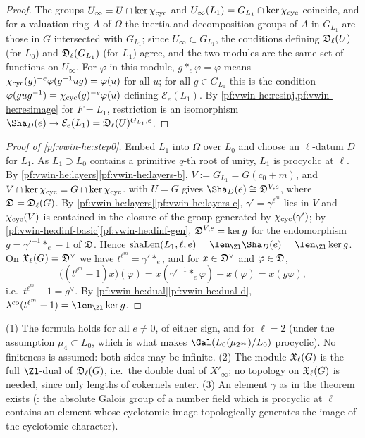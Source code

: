 \begin{proof}
The groups $U_\infty=U\cap\ker\chi_{\mathrm{cyc}}$ and $U_\infty(L_1)=G_{L_1}\cap\ker\chi_{\mathrm{cyc}}$ coincide, and for a valuation ring
$A$ of $\Omega$ the inertia and decomposition groups of $A$ in $G_{L_1}$ are those in $G$ intersected with $G_{L_1}$;
since $U_\infty\subset G_{L_1}$, the conditions defining $\mathfrak D_\ell(U)$ (for $L_0$) and $\mathfrak D_\ell(G_{L_1})$
(for $L_1$) agree, and the two modules are the same set of functions on $U_\infty$. For $\varphi$ in this module,
$g\ast_e\varphi=\varphi$ means $\chi_{\mathrm{cyc}}(g)^{-e}\varphi(g^{-1}ug)=\varphi(u)$ for all $u$; for all $g\in G_{L_1}$ this
is the condition $\varphi(gug^{-1})=\chi_{\mathrm{cyc}}(g)^{-e}\varphi(u)$ defining $\mathcal E_e(L_1)$. By
\cref{pf:vwin-he:resinj,pf:vwin-he:resimage} for $F=L_1$, restriction is an isomorphism
$\Sha_D(e)\to\mathcal E_e(L_1)=\vwinheD_\ell(U)^{G_{L_1},e}$.
\end{proof}

\begin{proof}[Proof of \cref{pf:vwin-he:step0}]
Embed $L_1$ into $\Omega$ over $L_0$ and choose an $\ell$-datum $D$ for $L_1$. As $L_1\supset L_0$ contains a primitive
$q$-th root of unity, $L_1$ is procyclic at $\ell$. By \cref{pf:vwin-he:layers}\ref{pf:vwin-he:layers-b},
$V:=G_{L_1}=G(c_0+m)$, and $V\cap\ker\chi_{\mathrm{cyc}}=G\cap\ker\chi_{\mathrm{cyc}}$.  with $U=G$ gives
$\Sha_D(e)\cong\vwinheD^{V,e}$, where $\mathfrak D=\mathfrak D_\ell(G)$. By
\cref{pf:vwin-he:layers}\ref{pf:vwin-he:layers-c}, $\gamma'=\gamma^{\ell^m}$ lies in $V$ and $\chi_{\mathrm{cyc}}(V)$ is contained in the
closure of the group generated by $\chi_{\mathrm{cyc}}(\gamma')$; by
\cref{pf:vwin-he:dinf-basic}\ref{pf:vwin-he:dinf-gen}, $\mathfrak D^{V,e}=\ker g$ for the endomorphism
$g=\gamma'^{-1}\ast_e-1$ of $\mathfrak D$. Hence $\mathrm{shaLen}(L_1,\ell,e)=\len_{\Zl}\Sha_D(e)=\len_{\Zl}\ker g$. On
$\mathfrak X_\ell(G)=\mathfrak D^\vee$ we have $t^{\ell^m}=\gamma'\ast_e$, and for $x\in\mathfrak D^\vee$ and
$\varphi\in\mathfrak D$,
\[
 \bigl((t^{\ell^m}-1)x\bigr)(\varphi)=x(\gamma'^{-1}\ast_e\varphi)-x(\varphi)=x(g\varphi),
\]
i.e.\ $t^{\ell^m}-1=g^\vee$. By \cref{pf:vwin-he:dual}\ref{pf:vwin-he:dual-d},
$\vwinhecoker(t^{\ell^m}-1)=\len_{\Zl}\ker g$.
\end{proof}

\begin{remark}\label{pf:vwin-he:rem-descent}
(1) The formula holds for all $e\ne0$, of either sign, and for $\ell=2$ (under the assumption $\mu_4\subset L_0$, which
is what makes $\Gal(L_0(\mu_{2^\infty})/L_0)$ procyclic). No finiteness is assumed: both sides may be infinite.
(2) The module $\mathfrak X_\ell(G)$ is the full $\Zl$-dual of $\mathfrak D_\ell(G)$, i.e.\ the double dual of $X'_\infty$;
no topology on $\mathfrak X_\ell(G)$ is needed, since only lengths of cokernels enter.
(3) An element $\gamma$ as in the theorem exists (: the absolute Galois group of
a number field which is procyclic at $\ell$ contains an element whose cyclotomic image topologically generates the
image of the cyclotomic character).
\end{remark}

